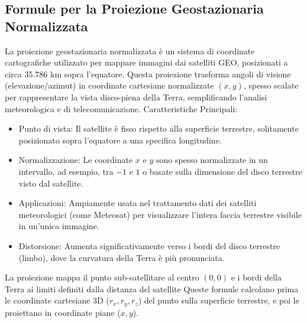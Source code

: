\documentclass[a4paper,14pt]{article}
\begin{document}
\subsection{Formule per la Proiezione Geostazionaria Normalizzata}
La proiezione geostazionaria normalizzata è un sistema di coordinate cartografiche utilizzato per mappare immagini dai satelliti GEO, posizionati a circa 35.786 km sopra l'equatore. Questa proiezione trasforma angoli di visione (elevazione/azimut) in coordinate cartesiane normalizzate \((x,y)\), spesso scalate per rappresentare la vista disco-piena della Terra, semplificando l'analisi meteorologica e di telecomunicazione.
Caratteristiche Principali:
\begin{itemize}
\item Punto di vista: Il satellite è fisso rispetto alla superficie terrestre, solitamente posizionato sopra l'equatore a una specifica longitudine.
\item Normalizzazione: Le coordinate \(x\) e \(y\) sono spesso normalizzate in un intervallo, ad esempio, tra \(-1\) e \(1\) o basate sulla dimensione del disco terrestre visto dal satellite.
\item Applicazioni: Ampiamente usata nel trattamento dati dei satelliti meteorologici (come Meteosat) per visualizzare l'intera faccia terrestre visibile in un'unica immagine.
\item Distorsione: Aumenta significativamente verso i bordi del disco terrestre (limbo), dove la curvatura della Terra è più pronunciata.
\end{itemize}
La proiezione mappa il punto sub-satellitare al centro \((0,0)\) e i bordi della Terra ai limiti definiti dalla distanza del satellite
Queste formule calcolano prima le coordinate cartesiane 3D (\(r_{x},r_{y},r_{z}\)) del punto sulla superficie terrestre, e poi le proiettano in coordinate piane (\(x,y\)).
\end{document}
